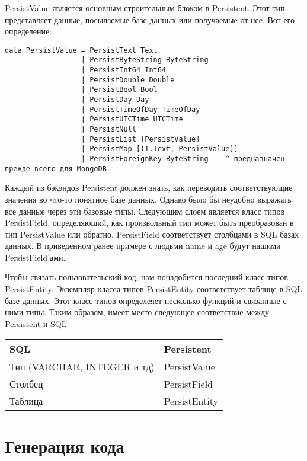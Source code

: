 PersistValue является основным строительным блоком в Persistent. Этот тип представляет данные, посылаемые базе данных или получаемые от нее. Вот его определение:

\begin{lstlisting}
data PersistValue = PersistText Text
                  | PersistByteString ByteString
                  | PersistInt64 Int64
                  | PersistDouble Double
                  | PersistBool Bool
                  | PersistDay Day
                  | PersistTimeOfDay TimeOfDay
                  | PersistUTCTime UTCTime
                  | PersistNull
                  | PersistList [PersistValue]
                  | PersistMap [(T.Text, PersistValue)]
                  | PersistForeignKey ByteString -- ^ предназначен прежде всего для MongoDB
\end{lstlisting}

Каждый из бэкэндов Persistent должен знать, как переводить соответствующие значения во что-то понятное базе данных. Однако было бы неудобно выражать все данные через эти базовые типы. Следующим слоем является класс типов PersistField, определяющий, как произвольный тип может быть преобразован в тип PersistValue или обратно. PersistField соответствует столбцами в SQL базах данных. В приведенном ранее примере с людьми name и age будут нашими PersistField'ами.

Чтобы связать пользовательский код, нам понадобится последний класс типов --- PersistEntity. Экземпляр класса типов PersistEntity соответствует таблице в SQL базе данных. Этот класс типов определеяет несколько функций и связанные с ними типы. Таким образом, имеет место следующее соответствие между Persistent и SQL:

\begin{center}
\begin{tabular}{ | l | l |}
\hline
SQL	& Persistent \\ \hline
Тип (VARCHAR, INTEGER и тд)	& PersistValue \\ \hline
Столбец & PersistField \\ \hline
Таблица	& PersistEntity \\ \hline
\end{tabular}
\end{center}

\section{Генерация кода} %

